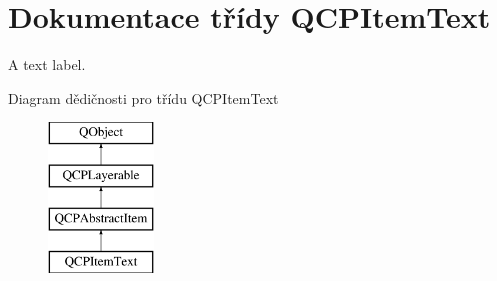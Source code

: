\hypertarget{classQCPItemText}{}\section{Dokumentace třídy Q\+C\+P\+Item\+Text}
\label{classQCPItemText}


A text label.  


Diagram dědičnosti pro třídu Q\+C\+P\+Item\+Text\begin{figure}[H]
\begin{center}
\leavevmode
\includegraphics[height=4.000000cm]{classQCPItemText}
\end{center}
\end{figure}
